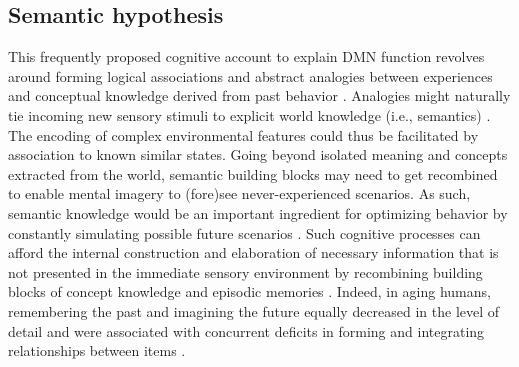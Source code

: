 \documentclass[10pt,letterpaper]{article}
\begin{document}
\subsection{Semantic hypothesis}
This frequently proposed cognitive account to explain DMN function revolves
around forming logical associations and abstract analogies between
experiences and conceptual knowledge derived from past behavior
\citep{bar2007proactive, binder1999conceptual, constantinescu2016organizing}.
Analogies might naturally tie incoming new sensory stimuli to
explicit world knowledge (i.e., semantics)
\citep{bar2009proactive}.
The encoding of complex environmental features could thus be facilitated
by association to known similar states.
%
Going beyond isolated meaning and concepts extracted from the world,
semantic building blocks may need to get recombined to enable
mental imagery to (fore)see never-experienced scenarios.
As such, semantic knowledge would be an important ingredient for optimizing behavior
by constantly simulating possible future scenarios
\citep{boyer2008evolutionary, binder2011neurobiology}.
Such cognitive processes can afford
the internal construction and elaboration of necessary information
that is not presented in the immediate sensory environment
by recombining building blocks of
concept knowledge and episodic memories
\citep{hassabis2009construction}.
Indeed, in aging humans, remembering the past and imagining the future
equally decreased in the level of detail and were associated with
concurrent deficits in forming and integrating relationships between
items \citep{addis2008age, spreng2006temporal}.
\end{document}
